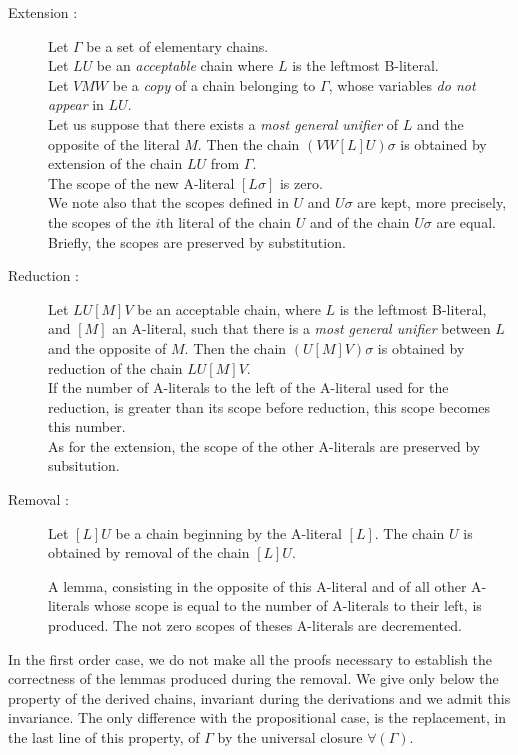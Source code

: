 \documentclass{article}
\begin{document}
\begin{description}
\item [Extension :]

Let $\Gamma$ be a set of elementary chains.\\
Let $L U$ be an \emph{acceptable} chain where $L$ is the leftmost B-literal.\\
Let $V M W$ be a \emph{copy} of a chain belonging to $\Gamma$, whose variables \emph{do not appear} in $L U$.\\
Let us suppose that there exists a \emph{most general unifier} of $L$ and the opposite of the literal $M$.
Then the chain  $(VW[L]U)\sigma$ is obtained by extension of the chain $LU$ from $\Gamma$.\\
The scope of the new A-literal $[L\sigma]$ is zero.\\
We note also that the scopes defined in $U$ and $U\sigma$ are kept, more precisely, the scopes of the $i$th literal 
of the chain $U$ and of the chain $U\sigma$ are equal. Briefly, the scopes are preserved by substitution.


\item [Reduction :]

Let $L U [M] V$ be an acceptable chain, where $L$ is the leftmost B-literal, and $[M]$ an A-literal, such that there is
a \emph{most general unifier} between $L$ and the opposite of $M$. Then the chain $(U [M]V)\sigma$ is obtained
by reduction of the chain  $L U [M]V$.\\
If the number of A-literals to the left of the A-literal used for the reduction, is greater than its scope before reduction,
this scope becomes this number.\\
As for the extension, the scope of the other A-literals are preserved by subsitution.


\item [Removal :] 

Let $[L]U$ be a chain beginning by the A-literal $[L]$. The chain $U$ is obtained by removal of the chain $[L]U$.

A lemma, consisting in the opposite of this A-literal and of all other A-literals whose scope is equal to the number
of A-literals to their left, is produced. The not zero scopes of theses A-literals are decremented.

\end{description}

In the first order case, we do not make all the proofs necessary to establish the correctness of the lemmas produced during
the removal.
We give only below the property of the derived chains, invariant during the derivations and we admit this invariance.
The only difference with the propositional case, is the replacement, in the last line
of this property,  of $\Gamma$ by the universal closure $\forall(\Gamma)$.
\end{document}
